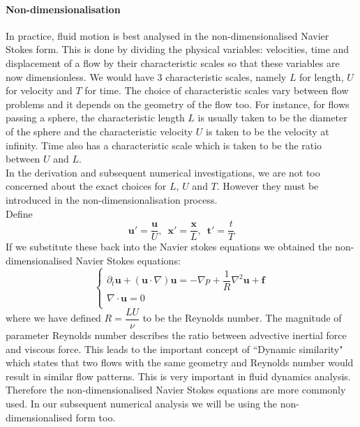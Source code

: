\paragraph*{Non-dimensionalisation}
In practice, fluid motion is best analysed in the non-dimensionalised Navier Stokes form. This is done by dividing the physical variables: velocities, time and displacement of a flow by their characteristic scales so that these variables are now dimensionless. We would have 3 characteristic scales, namely $L$ for length, $U$ for velocity and $T$ for time. The choice of characteristic scales vary between flow problems and it depends on the geometry of the flow too. For instance, for flows passing a sphere, the characteristic length $L$ is usually taken to be the diameter of the sphere and the characteristic velocity $U$ is taken to be the velocity at infinity. Time also has a characteristic scale which is taken to be the ratio between $U$ and $L$. \cite{chorin1990mathematical}\\

In the derivation and subsequent numerical investigations, we are not too concerned about the exact choices for $L,\,U$ and $T$. However they must be introduced in the non-dimensionalisation process.\\
Define
\begin{equation}
\textbf{u}' = \dfrac{\textbf{u}}{U},\,\,\,\textbf{x}' = \dfrac{\textbf{x}}{L},\,\,\,\textbf{t}'=\dfrac{t}{T}
\end{equation}
If we substitute these back into the Navier stokes equations we obtained the non-dimensionalised Navier Stokes equations:
\begin{equation}
\begin{cases}
\partial_t \textbf{u} + (\textbf{u} \cdot \nabla)\textbf{u} = -\nabla p + \dfrac{1}{R}\nabla^2\textbf{u}+\textbf{f}\\
\nabla \cdot \textbf{u}=0\\
\end{cases}
\end{equation}
where we have defined $R = \dfrac{LU}{\nu}$ to be the Reynolds number. The magnitude of parameter Reynolds number describes the ratio between advective inertial force and viscous force. This leads to the important concept of ``Dynamic similarity" which states that two flows with the same geometry and Reynolds number would result in similar flow patterns. This is very important in fluid dynamics analysis. Therefore the non-dimensionalised Navier Stokes equations are more commonly used. In our subsequent numerical analysis we will be using the non-dimensionalised form too.


